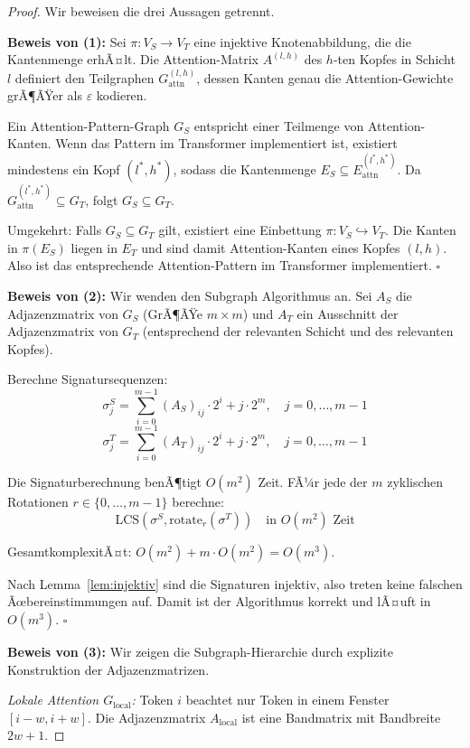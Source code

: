 ﻿\documentclass[a4paper,12pt]{article}
\theoremstyle{definition}
\begin{document}
\begin{proof}
Wir beweisen die drei Aussagen getrennt.

\textbf{Beweis von (1):} Sei $\pi: V_S \to V_T$ eine injektive Knotenabbildung,
die die Kantenmenge erhÃ¤lt. Die Attention-Matrix $A^{(l,h)}$ des $h$-ten Kopfes
in Schicht $l$ definiert den Teilgraphen $G_{\mathrm{attn}}^{(l,h)}$, dessen
Kanten genau die Attention-Gewichte grÃ¶ÃŸer als $\varepsilon$ kodieren.

Ein Attention-Pattern-Graph $G_S$ entspricht einer Teilmenge von Attention-Kanten.
Wenn das Pattern im Transformer implementiert ist, existiert mindestens ein Kopf
$(l^*, h^*)$, sodass die Kantenmenge $E_S \subseteq E_{\mathrm{attn}}^{(l^*, h^*)}$.
Da $G_{\mathrm{attn}}^{(l^*, h^*)} \subseteq G_T$, folgt $G_S \subseteq G_T$.

Umgekehrt: Falls $G_S \subseteq G_T$ gilt, existiert eine Einbettung
$\pi: V_S \hookrightarrow V_T$. Die Kanten in $\pi(E_S)$ liegen in $E_T$ und
sind damit Attention-Kanten eines Kopfes $(l, h)$. Also ist das entsprechende
Attention-Pattern im Transformer implementiert. \qquad $\square$

\textbf{Beweis von (2):} Wir wenden den Subgraph Algorithmus an.
Sei $A_S$ die Adjazenzmatrix von $G_S$ (GrÃ¶ÃŸe $m \times m$) und $A_T$ ein
Ausschnitt der Adjazenzmatrix von $G_T$ (entsprechend der relevanten Schicht
und des relevanten Kopfes).

Berechne Signatursequenzen:
\[
\sigma_j^S = \sum_{i=0}^{m-1} (A_S)_{ij} \cdot 2^i + j \cdot 2^m, \quad j = 0,\ldots,m-1
\]
\[
\sigma_j^T = \sum_{i=0}^{m-1} (A_T)_{ij} \cdot 2^i + j \cdot 2^m, \quad j = 0,\ldots,m-1
\]

Die Signaturberechnung benÃ¶tigt $O(m^2)$ Zeit. FÃ¼r jede der $m$ zyklischen
Rotationen $r \in \{0,\ldots,m-1\}$ berechne:
\[
\mathrm{LCS}(\sigma^S, \mathrm{rotate}_r(\sigma^T)) \quad \text{in } O(m^2) \text{ Zeit}
\]

GesamtkomplexitÃ¤t: $O(m^2) + m \cdot O(m^2) = O(m^3)$.

Nach Lemma~\ref{lem:injektiv} sind die Signaturen injektiv, also treten
keine falschen Ãœbereinstimmungen auf. Damit ist der Algorithmus korrekt
und lÃ¤uft in $O(m^3)$. \qquad $\square$

\textbf{Beweis von (3):} Wir zeigen die Subgraph-Hierarchie durch
explizite Konstruktion der Adjazenzmatrizen.

\textit{Lokale Attention $G_{\mathrm{local}}$:} Token $i$ beachtet nur
Token in einem Fenster $[i-w, i+w]$. Die Adjazenzmatrix $A_{\mathrm{local}}$
ist eine Bandmatrix mit Bandbreite $2w+1$.


\end{proof}
\end{document}
